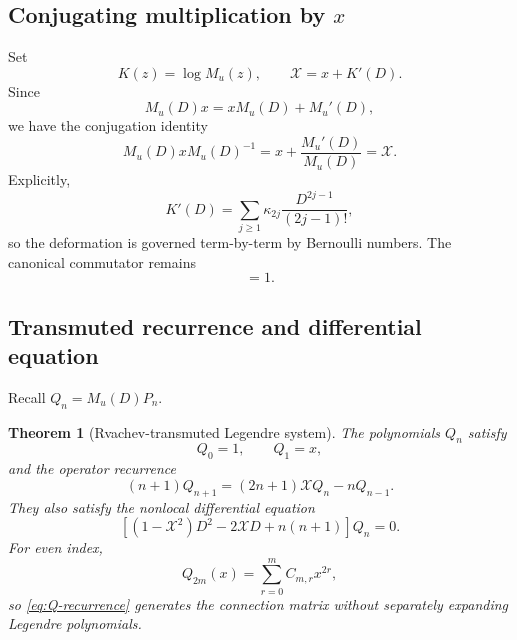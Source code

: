 \documentclass[11pt,oneside]{article}
\newtheorem{theorem}{Theorem}[section]
\theoremstyle{definition}
\theoremstyle{remark}
\newcommand{\cX}{\mathcal X}
\begin{document}
\subsection{Conjugating multiplication by $x$}
Set
\begin{equation}
 K(z)=\log M_u(z),
 \qquad
 \cX=x+K'(D).
 \label{eq:Xcal}
\end{equation}
Since
\begin{equation}
 M_u(D)x=xM_u(D)+M_u'(D),
 \label{eq:commutator}
\end{equation}
we have the conjugation identity
\begin{equation}
 M_u(D)xM_u(D)^{-1}=x+\frac{M_u'(D)}{M_u(D)}=\cX.
 \label{eq:x-conjugation}
\end{equation}
Explicitly,
\begin{equation}
 K'(D)=\sum_{j\ge1}\kappa_{2j}\frac{D^{2j-1}}{(2j-1)!},
 \label{eq:Kprime}
\end{equation}
so the deformation is governed term-by-term by Bernoulli numbers.  The
canonical commutator remains
\begin{equation}
 [D,\cX]=1.
 \label{eq:canonical-commutator}
\end{equation}

\subsection{Transmuted recurrence and differential equation}
Recall $Q_n=M_u(D)P_n$.

\begin{theorem}[Rvachev-transmuted Legendre system]
\label{thm:transmuted}
The polynomials $Q_n$ satisfy
\begin{equation}
 Q_0=1,
 \qquad Q_1=x,
 \label{eq:Q-initial}
\end{equation}
and the operator recurrence
\begin{equation}
 \boxed{
 (n+1)Q_{n+1}=(2n+1)\cX Q_n-nQ_{n-1}.}
 \label{eq:Q-recurrence}
\end{equation}
They also satisfy the nonlocal differential equation
\begin{equation}
 \boxed{
 \left[(1-\cX^2)D^2-2\cX D+n(n+1)\right]Q_n=0.}
 \label{eq:Q-differential}
\end{equation}
For even index,
\begin{equation}
 Q_{2m}(x)=\sum_{r=0}^{m}C_{m,r}x^{2r},
 \label{eq:Q-C}
\end{equation}
so \eqref{eq:Q-recurrence} generates the connection matrix without separately
expanding Legendre polynomials.
\end{theorem}
\end{document}
